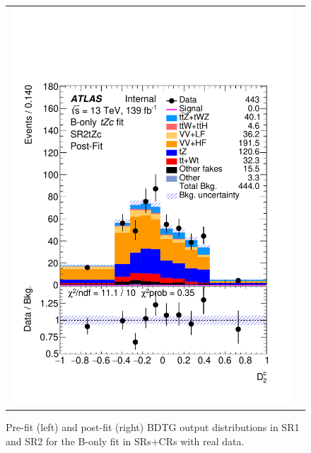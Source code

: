 \begin{figure}[htbp]
\begin{tabular}{cc}
		\includegraphics[width=.45\textwidth]{Chapters/CH8/figures/BONLY_CRSR_DL1rc_unblind/Plots/SR2_postFit} \\
	\end{tabular}
	\caption{Pre-fit (left) and post-fit (right) BDTG output distributions in SR1 and SR2 for the B-only \tZc fit in SRs+CRs with real data.
		\ErrStatSys
	}%
	\label{fig:stat:tzc:splusb:crsr:srplots:1_unb}
\end{figure}

